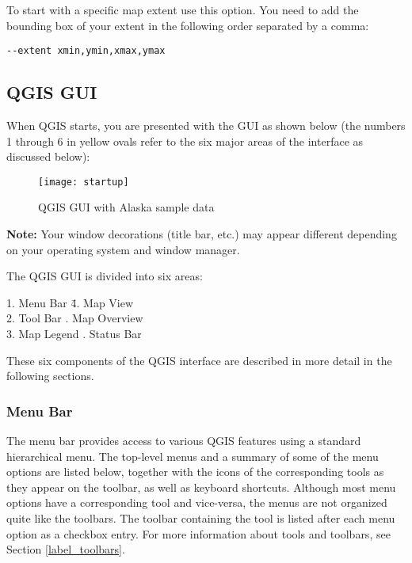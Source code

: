To start with a specific map extent use this option. You need to add the bounding
box of your extent in the following order separated by a comma:
\begin{verbatim}
--extent xmin,ymin,xmax,ymax
\end{verbatim}


\subsection{QGIS GUI}
\label{label_qgismainwindow}

When QGIS starts, you are presented with the GUI as shown below
(the numbers 1 through 6 in yellow ovals refer to the six major areas of the
interface as discussed below):

\begin{figure}[ht]
   \begin{center}
   \caption{QGIS GUI with Alaska sample data \nixcaption}
	 \label{fig:startup}
   \texttt{[image: startup]}
\end{center} 
\end{figure}

\textbf{Note:} Your window decorations (title bar, etc.) may appear
different depending on your operating system and window manager.

The QGIS GUI is divided into six areas:

\begin{tabbing}
1. Menu Bar \hspace{3cm}\= 4. Map View \\
2. Tool Bar \hspace{3cm}. Map Overview  \\
3. Map Legend \hspace{3cm}. Status Bar   
\end{tabbing}

These six components of the QGIS interface are described in more detail in
the following sections.

\subsubsection{Menu Bar}\label{label_menubar}

The menu bar provides access to various QGIS features using a standard 
hierarchical menu. The top-level menus and a summary of some of the
menu options are listed below, together with the icons of the corresponding 
tools as they appear on the toolbar, as well as keyboard shortcuts.
Although most menu options have a corresponding tool and vice-versa,
the menus are not organized quite like the toolbars. 
The toolbar containing the tool is listed after each menu option as a checkbox
entry. For more information about tools and toolbars, see Section \ref{label_toolbars}.

